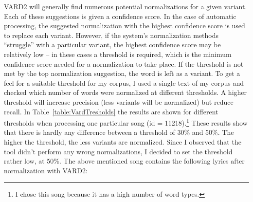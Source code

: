 VARD2 will generally find numerous potential normalizations for a given variant. Each of these suggestions is given a confidence score. In the case of automatic processing, the suggested normalization with the highest confidence score is used to replace each variant. However, if the system's normalization methods \enquote{struggle} with a particular variant, the highest confidence score may be relatively low -- in these cases a threshold is required, which is the minimum confidence score needed for a normalization to take place. If the threshold is not met by the top normalization suggestion, the word is left as a variant. To get a feel for a suitable threshold for my corpus, I used a single text of my corpus and checked which number of words were normalized at different thresholds. A higher threshold will increase precision (less variants will be normalized) but reduce recall. In Table~\ref{table:VardTresholds} the results are shown for different thresholds when processing one particular song (id = 11218).\footnote{I chose this song because it has a high number of word types.} These results show that there is hardly any difference between a threshold of 30\% and 50\%. The higher the threshold, the less variants are normalized. Since I observed that the tool didn't perform any wrong normalizations, I decided to set the threshold rather low, at 50\%. The above mentioned song contains the following lyrics after normalization with VARD2:

